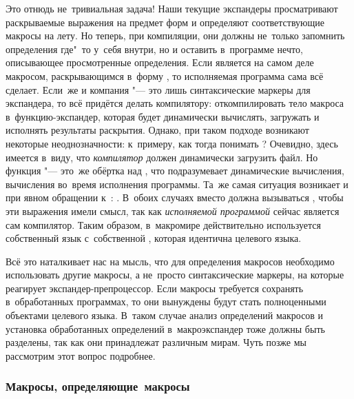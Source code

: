 Это отнюдь не~тривиальная задача! Наши текущие экспандеры просматривают
раскрываемые выражения на предмет форм  и определяют
соответствующие макросы на лету. Но теперь, при компиляции, они должны не~только
запомнить определения где"~то у~себя внутри, но и оставить в~программе нечто,
описывающее просмотренные определения. Если  является на
самом деле макросом, раскрывающимся в~форму , то исполняемая
программа сама всё сделает. Если~же  и компания "--- это
лишь синтаксические маркеры для экспандера, то всё придётся делать компилятору:
откомпилировать тело макроса в~функцию-экспандер, которая будет динамически
вычислять, загружать и исполнять результаты раскрытия. Однако, при таком подходе
возникают некоторые неоднозначности: к~примеру, как тогда понимать
? Очевидно, здесь имеется в~виду,
что \emph{компилятор} должен динамически загрузить файл. Но функция 
"--- это~же обёртка над , что подразумевает динамические вычисления,
вычисления во~время исполнения программы. Та~же самая ситуация возникает и при
явном обращении к~: . В~обоих случаях вместо  должна
вызываться , чтобы эти выражения имели смысл, так как
\emph{исполняемой программой} сейчас является сам компилятор. Таким образом,
в~макромире действительно используется собственный язык с~собственной ,
которая идентична  целевого языка.

Всё это наталкивает нас на мысль, что для определения макросов необходимо
использовать другие макросы, а не~просто синтаксические маркеры, на которые
реагирует экспандер-препроцессор. Если макросы требуется сохранять
в~обработанных программах, то они вынуждены будут стать полноценными объектами
целевого языка. В~таком случае анализ определений макросов и установка
обработанных определений в~макроэкспандер тоже должны быть разделены, так как
они принадлежат различным мирам. Чуть позже мы рассмотрим этот вопрос подробнее.


\subsubsection{Макросы, определяющие~макросы}%
\label{macros/define/comparison/sssect:defining}

